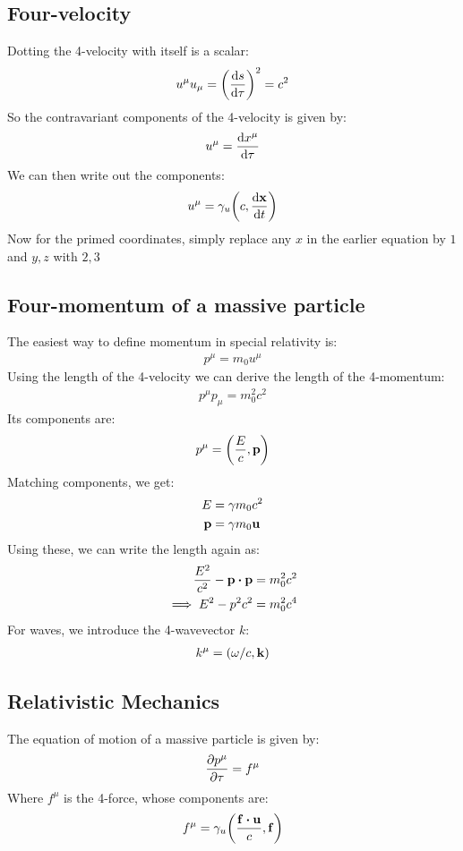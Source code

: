 \documentclass[12pt]{article}
\begin{document}
\subsection{Four-velocity}
Dotting the 4-velocity with itself is a scalar:
\begin{align*}
  u^\mu u_\mu=\qty(\dv{s}{\tau})^2=c^2
\end{align*}
So the contravariant components of the 4-velocity is given by:
\begin{align*}
  u^\mu=\dv{x^\mu}{\tau}
\end{align*}
We can then write out the components:
\begin{align*}
  u^\mu=\gamma_u\qty(c,\dv{\vb{x}}{t})
\end{align*}
Now for the primed coordinates, simply replace any $x$ in the earlier equation by $1$ and $y,z$ with  $2,3$
\subsection{Four-momentum of a massive particle}
The easiest way to define momentum in special relativity is:
\begin{align*}
  p^\mu=m_0u^\mu
\end{align*}
Using the length of the 4-velocity we can derive the length of the 4-momentum:
\begin{align*}
  p^\mu p_\mu=m_0^2c^2
\end{align*}
Its components are:
\begin{align*}
  p^\mu=\qty(\frac{E}{c},\vb{p})
\end{align*}
Matching components, we get:
\begin{align*}
  E&=\gamma m_0c^2\\
  \vb{p}&=\gamma m_0\vb{u}
\end{align*}
Using these, we can write the length again as:
\begin{align*}
  \frac{E^2}{c^2}-\vb{p}\vdot\vb{p}&=m_0^2c^2\\
  \implies E^2-p^2c^2&=m_0^2c^4
\end{align*}
For waves, we introduce the 4-wavevector $k$:
\begin{align*}
  k^\mu=(\omega/c,\vb{k})
\end{align*}
\subsection{Relativistic Mechanics}
The equation of motion of a massive particle is given by:
\begin{align*}
  \pdv{p^\mu}{\tau}=f^\mu
\end{align*}
Where $f^\mu$ is the 4-force, whose components are:
\begin{align*}
  f^\mu=\gamma_u\qty(\frac{\vb{f}\vdot\vb{u}}{c},\vb{f})
\end{align*}
\end{document}
